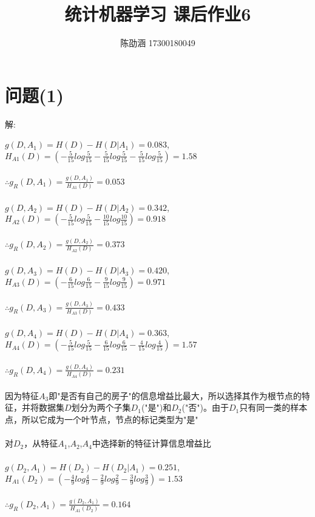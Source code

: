 \documentclass[]{article}
\title{统计机器学习 课后作业6}
\author{陈劭涵 17300180049}
\begin{document}
	
\maketitle


\section{问题(1)}
\begin{flushleft}
解:
\end{flushleft}
$g(D,A_1)=H(D)-H(D|A_1)=0.083$, $H_{A1}(D)=(-\frac{5}{15}log\frac{5}{15}-\frac{5}{15}log\frac{5}{15}-\frac{5}{15}log\frac{5}{15})=1.58$\\\\
$\therefore g_R(D,A_1)=\frac{g(D,A_1)}{H_{A1}(D)}=0.053$\\\\
$g(D,A_2)=H(D)-H(D|A_2)=0.342$, $H_{A2}(D)=(-\frac{5}{15}log\frac{5}{15}-\frac{10}{15}log\frac{10}{15})=0.918$\\\\
$\therefore g_R(D,A_2)=\frac{g(D,A_2)}{H_{A2}(D)}=0.373$\\\\
$g(D,A_3)=H(D)-H(D|A_3)=0.420$, $H_{A3}(D)=(-\frac{6}{15}log\frac{6}{15}-\frac{9}{15}log\frac{9}{15})=0.971$\\\\
$\therefore g_R(D,A_3)=\frac{g(D,A_3)}{H_{A3}(D)}=0.433$\\\\
$g(D,A_4)=H(D)-H(D|A_4)=0.363$, $H_{A4}(D)=(-\frac{5}{15}log\frac{5}{15}-\frac{6}{15}log\frac{6}{15}-\frac{4}{15}log\frac{4}{15})=1.57$\\\\
$\therefore g_R(D,A_4)=\frac{g(D,A_4)}{H_{A4}(D)}=0.231$\\\\
因为特征$A_3$即"是否有自己的房子"的信息增益比最大，所以选择其作为根节点的特征，并将数据集$D$划分为两个子集$D_1$("是")和$D_2$("否")。由于$D_1$只有同一类的样本点，所以它成为一个叶节点，节点的标记类型为"是"\\\\
对$D_2$，从特征$A_1$,$A_2$,$A_4$中选择新的特征计算信息增益比\\\\
$g(D_2,A_1)=H(D_2)-H(D_2|A_1)=0.251$, $H_{A1}(D_2)=(-\frac{4 }{9}log\frac{4}{9}-\frac{2}{9}log\frac{2}{9}-\frac{3}{9}log\frac{3}{9})=1.53$\\\\
$\therefore g_R(D_2,A_1)=\frac{g(D_2,A_1)}{H_{A1}(D_2)}=0.164$\\\\
\end{document}
